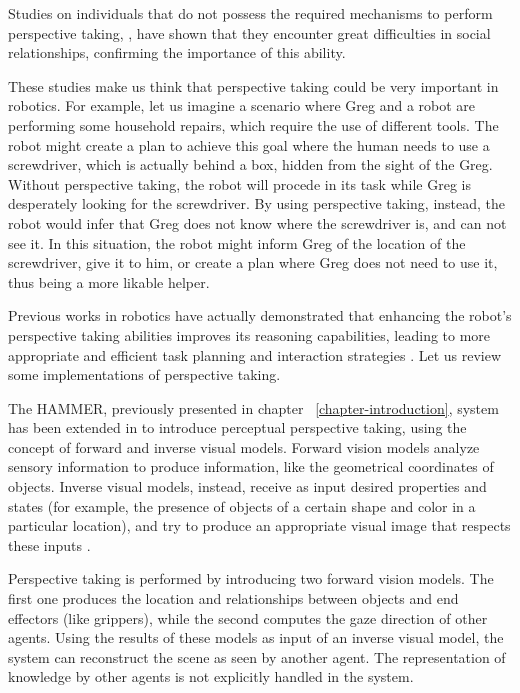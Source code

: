 Studies on individuals that do not possess the required mechanisms to perform perspective taking, \cite{frick2014picturing}, have shown that they encounter great difficulties in social relationships,  confirming the importance of this ability.

These studies make us think that perspective taking could be very important in robotics. For example, let us imagine a scenario where Greg and a robot are performing some household repairs, which require the use of different tools. The robot might create a plan to achieve this goal where the human needs to use a screwdriver, which is actually behind a box, hidden from the sight of the Greg. Without perspective taking, the robot will procede in its task while Greg is desperately looking for the screwdriver. By using perspective taking, instead, the robot would infer that Greg does not know where the screwdriver is, and can not see it. In this situation, the robot might inform Greg of the location of the screwdriver, give it to him, or create a plan where Greg does not need to use it, thus being a more likable helper.

Previous works in robotics have actually demonstrated that enhancing the robot's perspective taking abilities improves its reasoning capabilities, leading to more appropriate and efficient task planning and interaction strategies \cite{Trafton2005,ros2010one,breazeal2006}. Let us review some implementations of perspective taking.

The HAMMER, previously presented in chapter ~\ref{chapter-introduction}, system has been extended in \cite{johnson2005perceptual} to introduce perceptual perspective taking, using the concept of forward and inverse visual models. Forward vision models analyze sensory information to produce information, like the geometrical coordinates of objects. Inverse visual models, instead, receive as input desired properties and states (for example, the presence of objects of a certain shape and color in a particular location), and try to produce an appropriate visual image that respects these inputs .

Perspective taking is performed by introducing two forward vision models. The first one produces the location and relationships between objects and end effectors (like grippers), while the second  computes the gaze direction of other agents. Using the results of these models as input of an inverse visual model, the system can reconstruct the scene as seen by another agent. The representation of knowledge by other agents is not explicitly handled in the system. 

